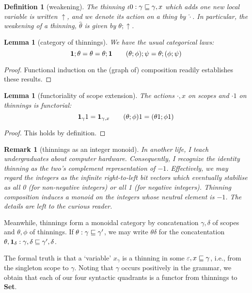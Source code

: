 \documentclass{jfp1}
\newtheorem{lemma}[theorem]{Lemma}
\newtheorem{definition}[theorem]{Definition}
\newtheorem{remark}[theorem]{Remark}
\newcommand{\emp}{\varepsilon}
\begin{document}
\newcommand{\wk}{\uparrow}
\newcommand{\wka}{\hat}
\begin{definition}[weakening]
  The thinning $\iota0 : \gamma\sqsubseteq\gamma,x$ which adds one new local variable is written
  $\wk$, and we denote its action on a thing by $\wka\cdot$. In particular, the weakening
  of a thinning, $\wka\theta$ is given by $\theta;\wk$.
\end{definition}

\begin{lemma}[category of thinnings]
  We have the usual categorical laws:
  \[
    \mathbf{1};\theta = \theta = \theta;\mathbf{1} \qquad
    (\theta;\phi);\psi = \theta;(\phi;\psi)
    \]
\end{lemma}
\begin{proof}
  Functional induction on the (graph of) composition readily establishes these results.
\end{proof}

\begin{lemma}[functoriality of scope extension]
  The actions $\cdot,x$ on scopes and $\cdot1$ on thinnings is functorial:
  \[
    \mathbf{1}_\gamma1 = \mathbf{1}_{\gamma,x}\qquad (\theta;\phi)1 = (\theta1;\phi1)
    \]
\end{lemma}
\begin{proof}
  This holds by definition.
\end{proof}

\begin{remark}[thinnings as an integer monoid]
  In another life, I teach undergraduates about computer hardware. Consequently, I recognize the identity thinning as the two's complement representation of $-1$.
  Effectively, we may regard the integers as the infinite right-to-left bit vectors which eventually stabilise as all 0 (for non-negative integers) or all 1 (for negative integers). Thinning composition induces a monoid on the integers whose neutral element is $-1$. The details are left to the curious reader.
\end{remark}

Meanwhile, thinnings form a monoidal category by concatenation
$\gamma,\delta$ of scopes and $\theta,\phi$ of thinnings.
If $\theta : \gamma\sqsubseteq\gamma'$, we may write $\theta\delta$ for
the concatentation $\theta,\mathbf{1}_\delta : \gamma,\delta \sqsubseteq \gamma',\delta$.

The formal truth is that a `variable' $x_\gamma$ is a thinning
in some $\emp,x \thin \gamma$, i.e., from the singleton scope to $\gamma$. Noting that $\gamma$ occurs
positively in the grammar, we obtain that each of our four syntactic
quadrants is a functor from thinnings to \textbf{Set}.
\end{document}
